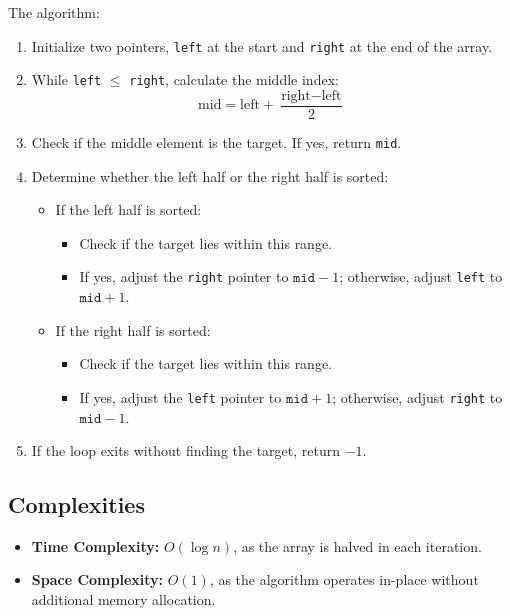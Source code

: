 The algorithm:
\begin{enumerate}
    \item Initialize two pointers, \texttt{left} at the start and \texttt{right} at the end of the array.
    \item While \texttt{left} \(\leq\) \texttt{right}, calculate the middle index: 
    \[
    \text{mid} = \text{left} + \frac{\text{right} - \text{left}}{2}
    \]
    \item Check if the middle element is the target. If yes, return \texttt{mid}.
    \item Determine whether the left half or the right half is sorted:
    \begin{itemize}
        \item If the left half is sorted:
        \begin{itemize}
            \item Check if the target lies within this range.
            \item If yes, adjust the \texttt{right} pointer to \(\texttt{mid} - 1\); otherwise, adjust \texttt{left} to \(\texttt{mid} + 1\).
        \end{itemize}
        \item If the right half is sorted:
        \begin{itemize}
            \item Check if the target lies within this range.
            \item If yes, adjust the \texttt{left} pointer to \(\texttt{mid} + 1\); otherwise, adjust \texttt{right} to \(\texttt{mid} - 1\).
        \end{itemize}
    \end{itemize}
    \item If the loop exits without finding the target, return \(-1\).
\end{enumerate}

\subsection*{Complexities}
\begin{itemize}
    \item \textbf{Time Complexity:} \(O(\log n)\), as the array is halved in each iteration.
    \item \textbf{Space Complexity:} \(O(1)\), as the algorithm operates in-place without additional memory allocation.
\end{itemize}

